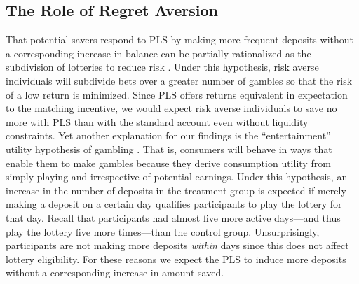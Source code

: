 \documentclass[11pt]{article}
\begin{document}




	\subsection{The Role of Regret Aversion}

		That potential savers respond to PLS by making more frequent deposits without a corresponding increase in balance can be partially rationalized as the subdivision of lotteries to reduce risk \parencite{samuelson_risk_1963}. Under this hypothesis, risk averse individuals will subdivide bets over a greater number of gambles so that the risk of a low return is minimized. Since PLS offers returns equivalent in expectation to the matching incentive, we would expect risk averse individuals to save no more with PLS than with the standard account even without liquidity constraints. Yet another explanation for our findings is the ``entertainment'' utility hypothesis of gambling \parencite{conlisk_utility_1993}. That is, consumers will behave in ways that enable them to make gambles because they derive consumption utility from simply playing and irrespective of potential earnings. Under this hypothesis, an increase in the number of deposits in the treatment group is expected if merely making a deposit on a certain day qualifies participants to play the lottery for that day. Recall that participants had almost five more active days---and thus play the lottery five more times---than the control group. Unsurprisingly, participants are not making more deposits \textit{within} days since this does not affect lottery eligibility. For these reasons we expect the PLS to induce more deposits without a corresponding increase in amount saved.
\end{document}
